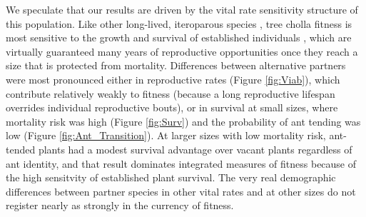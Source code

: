 \documentclass[11pt]{article}
\begin{document}
We speculate that our results are driven by the vital rate sensitivity structure of this population. 
Like other long-lived, iteroparous species \citep{franco2004comparative}, tree cholla fitness is most sensitive to the growth and survival of established individuals \citep{Miller2009,elderd2016quantifying}, which are virtually guaranteed many years of reproductive opportunities once they reach a size that is protected from mortality. 
Differences between alternative partners were most pronounced either in reproductive rates (Figure \ref{fig:Viab}), which contribute relatively weakly to fitness (because a long reproductive lifespan overrides individual reproductive bouts), or in survival at small sizes, where mortality risk was high (Figure \ref{fig:Surv}) and the probability of ant tending was low (Figure \ref{fig:Ant_Transition}). 
At larger sizes with low mortality risk, ant-tended plants had a modest survival advantage over vacant plants regardless of ant identity, and that result dominates integrated measures of fitness because of the high sensitvity of established plant survival. 
The very real demographic differences between partner species in other vital rates and at other sizes do not register nearly as strongly in the currency of fitness. 

\end{document}

